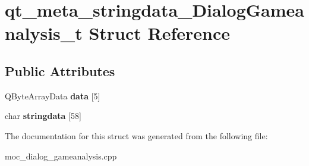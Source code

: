 \hypertarget{structqt__meta__stringdata__DialogGameanalysis__t}{\section{qt\-\_\-meta\-\_\-stringdata\-\_\-\-Dialog\-Gameanalysis\-\_\-t Struct Reference}
\label{structqt__meta__stringdata__DialogGameanalysis__t}
}
\subsection*{Public Attributes}
\begin{DoxyCompactItemize}
\item 
\hypertarget{structqt__meta__stringdata__DialogGameanalysis__t_a6e60545b83736522b0646d07ccf33318}{Q\-Byte\-Array\-Data {\bfseries data} \mbox{[}5\mbox{]}}\label{structqt__meta__stringdata__DialogGameanalysis__t_a6e60545b83736522b0646d07ccf33318}

\item 
\hypertarget{structqt__meta__stringdata__DialogGameanalysis__t_a0f746170f22b0f9edcd96a948ee1e8db}{char {\bfseries stringdata} \mbox{[}58\mbox{]}}\label{structqt__meta__stringdata__DialogGameanalysis__t_a0f746170f22b0f9edcd96a948ee1e8db}

\end{DoxyCompactItemize}


The documentation for this struct was generated from the following file\-:\begin{DoxyCompactItemize}
\item 
moc\-\_\-dialog\-\_\-gameanalysis.\-cpp\end{DoxyCompactItemize}
